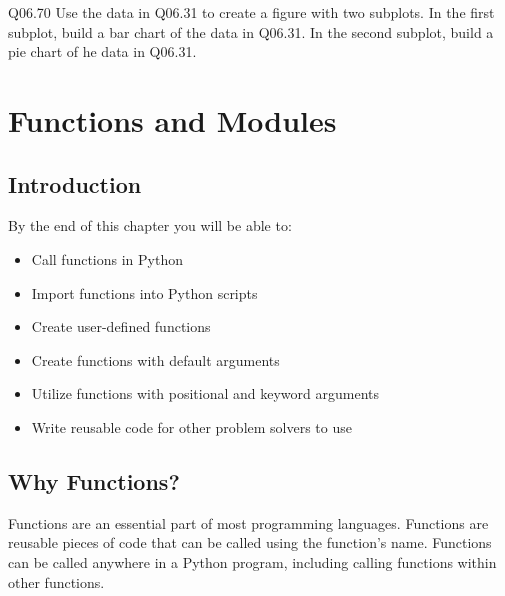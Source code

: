 \documentclass{book}
\begin{document}
Q06.70 Use the data in Q06.31 to create a figure with two subplots. In
the first subplot, build a bar chart of the data in Q06.31. In the
second subplot, build a pie chart of he data in Q06.31.
    




    
        \hypertarget{functions-and-modules}{%
\chapter{Functions and Modules}\label{functions-and-modules}}
    




    
        \hypertarget{introduction}{%
\section{Introduction}\label{introduction}}
    




    
        By the end of this chapter you will be able to:

\begin{itemize}
\item
  Call functions in Python
\item
  Import functions into Python scripts
\item
  Create user-defined functions
\item
  Create functions with default arguments
\item
  Utilize functions with positional and keyword arguments
\item
  Write reusable code for other problem solvers to use
\end{itemize}
        \newpage

    




    
        \hypertarget{why-functions}{%
\section{Why Functions?}\label{why-functions}}
    




    
        Functions are an essential part of most programming languages. Functions
are reusable pieces of code that can be called using the function's
name. Functions can be called anywhere in a Python program, including
calling functions within other functions.
\end{document}
